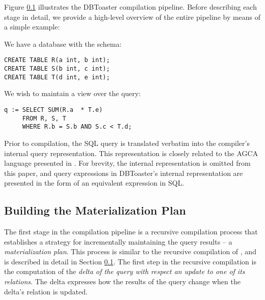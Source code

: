 Figure \ref{} illustrates the DBToaster compilation pipeline.  Before describing each stage in detail, we provide a high-level overview of the entire pipeline by means of a simple example:

\begin{example}
\label{ex:compiler:rst}
We have a database with the schema: 
\begin{verbatim}
CREATE TABLE R(a int, b int); 
CREATE TABLE S(b int, c int);
CREATE TABLE T(d int, e int);
\end{verbatim}

We wish to maintain a view over the query:
\begin{verbatim}
q := SELECT SUM(R.a  * T.e)
     FROM R, S, T
     WHERE R.b = S.b AND S.c < T.d;
\end{verbatim}
\end{example}

Prior to compilation, the SQL query is translated verbatim into the compiler's internal query representation.  This representation is closely related to the AGCA language presented in \cite{koch-pods:10}.  For brevity, the internal representation is omitted from this paper, and query expressions in DBToaster's internal representation are presented in the form of an equivalent expression in SQL.  

\subsection{Building the Materialization Plan}
The first stage in the compilation pipeline is a recursive compilation process that establishes a strategy for incrementally maintaining the query results -- a {\em materialization plan}.  This process is similar to the recursive compilation of \cite{kennedy-ahmad-koch-cidr:11,koch-pods:10}, and is described in detail in Section \ref{}.  The first step in the recursive compilation is the computation of the {\em delta of the query with respect an update to one of its relations}.  The delta expresses how the results of the query change when the delta's relation is updated.  


